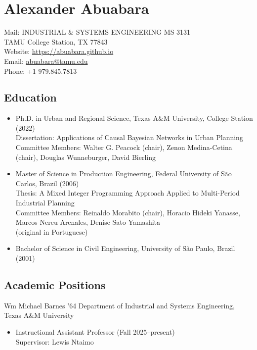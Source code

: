 \documentclass[11pt,oneside]{article}
\begin{document}
\pagestyle{firstpage}
\raggedright

\section*{Alexander Abuabara}
Mail: INDUSTRIAL \& SYSTEMS ENGINEERING MS 3131\\
\hspace{0.9cm} TAMU College Station, TX 77843\\[1pt]
Website: \url{https://abuabara.github.io}\\[1pt]
Email: \href{abuabara@tamu.edu}{abuabara@tamu.edu}\\[1pt]
Phone: +1 979.845.7813

\subsection*{Education}
\begin{itemize}[leftmargin=20pt]
\item Ph.D. in Urban and Regional Science, Texas A\&M University, College Station (2022)\\[1pt]
      Dissertation: Applications of Causal Bayesian Networks in Urban Planning\\[1pt]
      Committee Members: Walter G. Peacock (chair), Zenon Medina-Cetina (chair), Douglas Wunneburger, David Bierling
\item Master of Science in Production Engineering, Federal University of São Carlos, Brazil (2006)\\[1pt]
      Thesis: A Mixed Integer Programming Approach Applied to Multi-Period Industrial Planning\\[1pt]
      Committee Members: Reinaldo Morabito (chair), Horacio Hideki Yanasse, Marcos Nereu Arenales, Denise Sato Yamashita\\[0pt]
      {\small (original in Portuguese)}
\item Bachelor of Science in Civil Engineering, University of São Paulo, Brazil (2001)
\end{itemize}

\subsection*{Academic Positions}
{Wm Michael Barnes ’64 Department of Industrial and Systems Engineering, Texas A\&M University}
\begin{itemize}[leftmargin=20pt]
\item Instructional Assistant Professor (Fall 2025--present)\\
      Supervisor: Lewis Ntaimo
\end{itemize}
\end{document}
